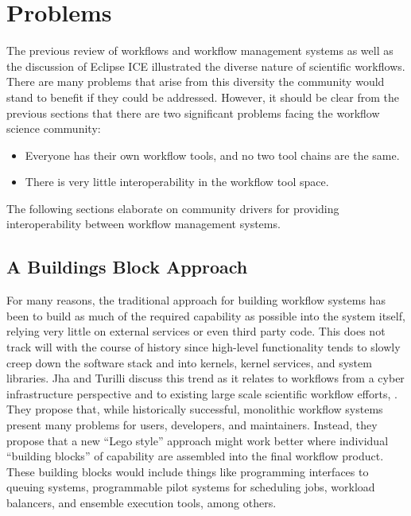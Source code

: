 \chapter{Problems}

The previous review of workflows and workflow management systems as well as the
discussion of Eclipse ICE illustrated the diverse nature of scientific
workflows. There are many problems that arise from this diversity the community
would stand to benefit if they could be addressed. However, it should be clear
from the previous sections that there are two significant problems facing the workflow science community:
\begin{itemize}
  \item Everyone has their own workflow tools, and
no two tool chains are the same.
  \item There is very little interoperability in the workflow tool space.
\end{itemize}

The following sections elaborate on community drivers for providing
interoperability between workflow management systems.

\section{A Buildings Block Approach}\label{a-buildings-block-approach}

For many reasons, the traditional approach for building workflow systems
has been to build as much of the required capability as possible into
the system itself, relying very little on external services or even
third party code. This does not track will with the course of history
since high-level functionality tends to slowly creep down the
software stack and into kernels, kernel services, and system libraries. Jha and
Turilli discuss this trend as it relates to workflows from a cyber
infrastructure perspective and to existing large scale scientific
workflow efforts, \cite{jha_building_2016}. They propose that, while historically
successful, monolithic workflow systems present many problems for users,
developers, and maintainers. Instead, they propose that a new ``Lego
style'' approach might work better where individual ``building blocks''
of capability are assembled into the final workflow product. These
building blocks would include things like programming interfaces to
queuing systems, programmable pilot systems for scheduling jobs,
workload balancers, and ensemble execution tools, among others.


